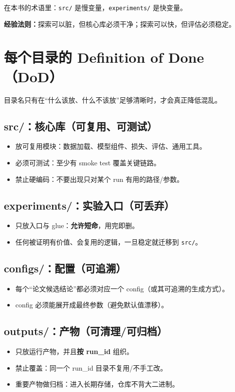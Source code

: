 在本书的术语里：\texttt{src/} 是慢变量，\texttt{experiments/} 是快变量。

\textbf{经验法则：}探索可以脏，但核心库必须干净；探索可以快，但评估必须稳定。

\section{每个目录的 Definition of Done（DoD）}
目录名只有在“什么该放、什么不该放”足够清晰时，才会真正降低混乱。

\subsection{src/：核心库（可复用、可测试）}
\begin{itemize}
  \item 放可复用模块：数据加载、模型组件、损失、评估、通用工具。
  \item 必须可测试：至少有 smoke test 覆盖关键链路。
  \item 禁止硬编码：不要出现只对某个 run 有用的路径/参数。
\end{itemize}

\subsection{experiments/：实验入口（可丢弃）}
\begin{itemize}
  \item 只放入口与 glue：\textbf{允许短命}，用完即删。
  \item 任何被证明有价值、会复用的逻辑，一旦稳定就迁移到 \texttt{src/}。
\end{itemize}

\subsection{configs/：配置（可追溯）}
\begin{itemize}
  \item 每个“论文候选结论”都必须对应一个 config（或其可追溯的生成方式）。
  \item config 必须能展开成最终参数（避免默认值漂移）。
\end{itemize}

\subsection{outputs/：产物（可清理/可归档）}
\begin{itemize}
  \item 只放运行产物，并且\textbf{按 run\_id} 组织。
  \item 禁止覆盖：同一个 run\_id 目录不复用/不手工改。
  \item 重要产物做归档：进入长期存储，仓库不背大二进制。
\end{itemize}


